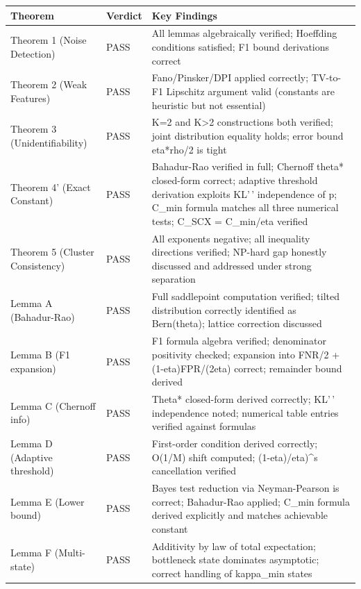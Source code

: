 \documentclass[
  12pt,
]{article}
\begin{document}
\begin{longtable}[]{@{}
  >{\raggedright\arraybackslash}p{}
  >{\raggedright\arraybackslash}p{}
  >{\raggedright\arraybackslash}p{}@{}}
\toprule\noalign{}
\begin{minipage}[b]{\linewidth}\raggedright
Theorem
\end{minipage} & \begin{minipage}[b]{\linewidth}\raggedright
Verdict
\end{minipage} & \begin{minipage}[b]{\linewidth}\raggedright
Key Findings
\end{minipage} \\
\midrule\noalign{}
\endhead
\bottomrule\noalign{}
\endlastfoot
Theorem 1 (Noise Detection) & PASS & All lemmas algebraically verified;
Hoeffding conditions satisfied; F1 bound derivations correct \\
Theorem 2 (Weak Features) & PASS & Fano/Pinsker/DPI applied correctly;
TV-to-F1 Lipschitz argument valid (constants are heuristic but not
essential) \\
Theorem 3 (Unidentifiability) & PASS & K=2 and K\textgreater2
constructions both verified; joint distribution equality holds; error
bound eta*rho/2 is tight \\
Theorem 4' (Exact Constant) & PASS & Bahadur-Rao verified in full;
Chernoff theta* closed-form correct; adaptive threshold derivation
exploits KL'\,' independence of p; C\_min formula matches all three
numerical tests; C\_SCX = C\_min/eta verified \\
Theorem 5 (Cluster Consistency) & PASS & All exponents negative; all
inequality directions verified; NP-hard gap honestly discussed and
addressed under strong separation \\
Lemma A (Bahadur-Rao) & PASS & Full saddlepoint computation verified;
tilted distribution correctly identified as Bern(theta); lattice
correction discussed \\
Lemma B (F1 expansion) & PASS & F1 formula algebra verified; denominator
positivity checked; expansion into FNR/2 + (1-eta)FPR/(2eta) correct;
remainder bound derived \\
Lemma C (Chernoff info) & PASS & Theta* closed-form derived correctly;
KL'\,' independence noted; numerical table entries verified against
formulas \\
Lemma D (Adaptive threshold) & PASS & First-order condition derived
correctly; O(1/M) shift computed; (1-eta)/eta)\^{}s cancellation
verified \\
Lemma E (Lower bound) & PASS & Bayes test reduction via Neyman-Pearson
is correct; Bahadur-Rao applied; C\_min formula derived explicitly and
matches achievable constant \\
Lemma F (Multi-state) & PASS & Additivity by law of total expectation;
bottleneck state dominates asymptotic; correct handling of kappa\_min
states \\
\end{longtable}
\end{document}
